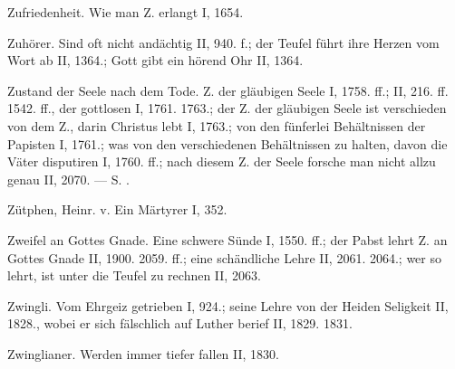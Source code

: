 Zufriedenheit. Wie man Z. erlangt I, 1654.

Zuhörer. Sind oft nicht andächtig II, 940. f.; der Teufel führt ihre Herzen vom Wort ab II, 1364.; Gott gibt ein hörend Ohr II, 1364.

Zustand der Seele nach dem Tode. Z. der gläubigen Seele I, 1758. ff.; II, 216. ff. 1542. ff., der gottlosen I, 1761. 1763.; der Z. der gläubigen Seele ist verschieden von dem Z., darin Christus lebt I, 1763.; von den fünferlei Behältnissen der Papisten I, 1761.; was von den verschiedenen Behältnissen zu halten, davon die Väter disputiren I, 1760. ff.; nach diesem Z. der Seele forsche man nicht allzu genau II, 2070. — S. .

Zütphen, Heinr. v. Ein Märtyrer I, 352.

Zweifel an Gottes Gnade. Eine schwere Sünde I, 1550. ff.; der Pabst lehrt Z. an Gottes Gnade II, 1900. 2059. ff.; eine schändliche Lehre II, 2061. 2064.; wer so lehrt, ist unter die Teufel zu rechnen II, 2063.

Zwingli. Vom Ehrgeiz getrieben I, 924.; seine Lehre von der Heiden Seligkeit II, 1828., wobei er sich fälschlich auf Luther berief II, 1829. 1831.

Zwinglianer. Werden immer tiefer fallen II, 1830.
